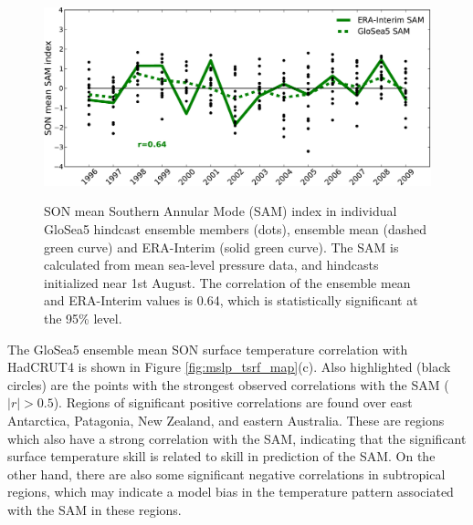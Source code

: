\begin{figure}[t]
  \noindent\includegraphics[width=\textwidth,angle=0]{figures/chapter-seasonal/sam_crop.pdf}\\
  \caption[GloSea5 predictions of the SAM.]{SON mean Southern Annular Mode (SAM)
    index in individual GloSea5 hindcast ensemble members (dots), ensemble mean
    (dashed green curve) and ERA-Interim (solid green curve). The SAM is
    calculated from mean sea-level pressure data, and hindcasts initialized near
    1st August. The correlation of the ensemble mean and ERA-Interim values is
    0.64, which is statistically significant at the 95\%
    level.}\label{fig:sam_ts}
\end{figure}

The GloSea5 ensemble mean SON surface temperature correlation with HadCRUT4 is
shown in Figure \ref{fig:mslp_tsrf_map}(c). Also highlighted (black circles) are
the points with the strongest observed correlations with the SAM ($|r| > 0.5$).
Regions of significant positive correlations are found over east Antarctica,
Patagonia, New Zealand, and eastern Australia. These are regions which also have
a strong correlation with the SAM, indicating that the significant surface
temperature skill is related to skill in prediction of the SAM. On the other
hand, there are also some significant negative correlations in subtropical
regions, which may indicate a model bias in the temperature pattern associated
with the SAM in these regions.

